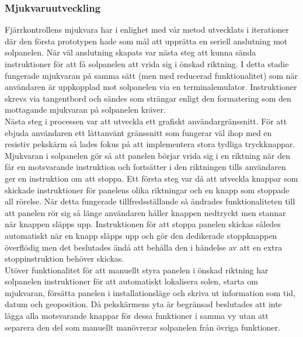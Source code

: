 \documentclass{article}
\begin{document}
            \newpage

            \subsubsection{Mjukvaruutveckling} %
            \label{subsub:mjukvaruutveckling}
            Fjärrkontrollens mjukvara har i enlighet med vår metod utvecklats i iterationer där den första prototypen hade som mål att upprätta en seriell anslutning mot solpanelen.
            När väl anslutning skapats var nästa steg att kunna sända instruktioner för att få solpanelen att vrida sig i önskad riktning. I detta stadie fungerade mjukvaran på samma sätt (men med reducerad funktionalitet) som när användaren är uppkopplad mot solpanelen via en terminalemulator. Instruktioner skrevs via tangentbord och sändes som strängar enligt den formatering som den mottagande mjukvaran på solpanelen kräver. \\

            
            \noindent Nästa steg i processen var att utveckla ett grafiskt användargränssnitt. För att ebjuda användaren ett lättanvänt gränssnitt som fungerar väl ihop med en resistiv pekskärm
            så lades fokus på att implementera stora tydliga tryckknappar. 
            Mjukvaran i solpanelen gör så att panelen börjar vrida sig i en riktning när den får en motsvarande instruktion och fortsätter i den riktningen tills användaren ger en instruktion om att stoppa. Ett första steg var då att utveckla knappar som skickade instruktioner för panelens olika riktningar och en knapp som stoppade all rörelse.
            När detta fungerade tillfredsställande så ändrades funktionaliteten till att panelen rör sig så länge användaren håller knappen nedtryckt men stannar när knappen släpps upp.
            Instruktionen för att stoppa panelen skickas således automatiskt när en knapp släpps upp och gör den dedikerade stoppknappen överflödig men det beslutades ändå att behålla den i händelse av att en extra stoppinstruktion behöver skickas. \\

            \noindent Utöver funktionalitet för att manuellt styra panelen i önskad riktning har solpanelen instruktioner för att automatiskt lokalisera solen, starta om mjukvaran, försätta panelen i installationsläge och skriva ut information som tid, datum och geoposition. Då pekskärmens yta är begränsad beslutades att inte lägga alla motsvarande knappar för dessa funktioner i samma vy utan att separera den del som manuellt manövrerar solpanelen från övriga funktioner.\\
\end{document}
